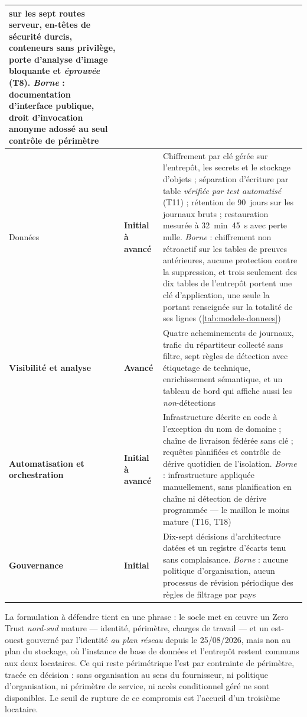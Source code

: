 {\begin{longtable}{|P{2.5cm}|P{1.7cm}|P{11.1cm}|}
sur les sept routes serveur, en-têtes de sécurité durcis, conteneurs sans privilège, porte
d'analyse d'image bloquante et \emph{éprouvée} (T8). \emph{Borne} : documentation d'interface
publique, droit d'invocation anonyme adossé au seul contrôle de périmètre \\ \hline
Données & \textbf{Initial à avancé} & Chiffrement par clé gérée sur l'entrepôt, les secrets et le
stockage d'objets ; séparation d'écriture par table \emph{vérifiée par test automatisé} (T11) ;
rétention de 90~jours sur les journaux bruts ; restauration mesurée à 32~min~45~s avec perte
nulle. \emph{Borne} : chiffrement non rétroactif sur les tables de preuves antérieures, aucune
protection contre la suppression, et trois seulement des dix tables de l'entrepôt portent une clé
d'application, une seule la portant renseignée sur la totalité de ses lignes
(\cref{tab:modele-donnees}) \\ \hline
\textbf{Visibilité et analyse} & \textbf{Avancé} & Quatre acheminements de journaux, trafic du
répartiteur collecté sans filtre, sept règles de détection avec étiquetage de technique,
enrichissement sémantique, et un tableau de bord qui affiche aussi les \emph{non}-détections \\ \hline
\textbf{Automatisation et orchestration} & \textbf{Initial à avancé} & Infrastructure décrite en
code à l'exception du nom de domaine ; chaîne de livraison fédérée sans clé ; requêtes planifiées
et contrôle de dérive quotidien de l'isolation. \emph{Borne} : infrastructure appliquée
manuellement, sans planification en chaîne ni détection de dérive programmée --- le maillon le
moins mature (T16, T18) \\ \hline
\textbf{Gouvernance} & \textbf{Initial} & Dix-sept décisions d'architecture datées et un registre
d'écarts tenu sans complaisance. \emph{Borne} : aucune politique d'organisation, aucun processus
de révision périodique des règles de filtrage par pays \\
\hline
\end{longtable}
}

La formulation à défendre tient en une phrase : le socle met en \oe uvre un Zero Trust
\emph{nord-sud} mature --- identité, périmètre, charges de travail --- et un est-ouest gouverné par
l'identité \emph{au plan réseau} depuis le 25/08/2026, mais non au plan du stockage, où l'instance
de base de données et l'entrepôt restent communs aux deux locataires. Ce qui reste périmétrique
l'est par contrainte de périmètre, tracée en décision : sans organisation au sens du fournisseur,
ni politique d'organisation, ni périmètre de service, ni accès conditionnel géré ne sont
disponibles. Le seuil de rupture de ce compromis est l'accueil d'un troisième locataire.

